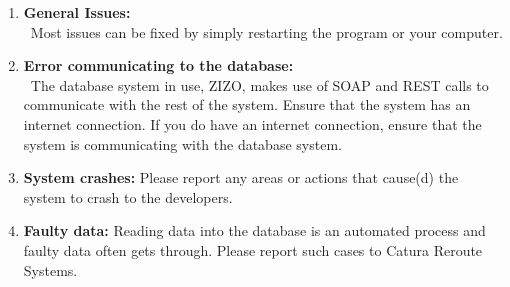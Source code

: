 \documentclass[a4paper,10pt]{article}
\begin{document}
	\begin{enumerate}
		\item \textbf{General Issues:}\\\
			Most issues can be fixed by simply restarting the program or your computer. 
		\item \textbf{Error communicating to the database:}\\\
			The database system in use, ZIZO, makes use of SOAP and REST calls to communicate with the rest of the system. Ensure that the system has an internet connection. If you do have an internet connection, ensure that the system is communicating with the database system. 
		\item \textbf{System crashes:}
			Please report any areas or actions that cause(d) the system to crash to the developers.
		\item \textbf{Faulty data:}
			Reading data into the database is an automated process and faulty data often gets through. Please report such cases to Catura Reroute Systems.
	\end{enumerate}
	
\end{document}
